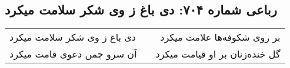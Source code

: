 \begin{center}
\section*{رباعی شماره ۷۰۴: دی باغ ز وی شکر سلامت میکرد}
\label{sec:0704}
\begin{longtable}{l p{0.5cm} r}
دی باغ ز وی شکر سلامت میکرد
&&
بر روی شکوفه‌ها علامت میکرد
\\
آن سرو چمن دعوی قامت میکرد
&&
گل خنده‌زنان بر او قیامت میکرد
\\
\end{longtable}
\end{center}
